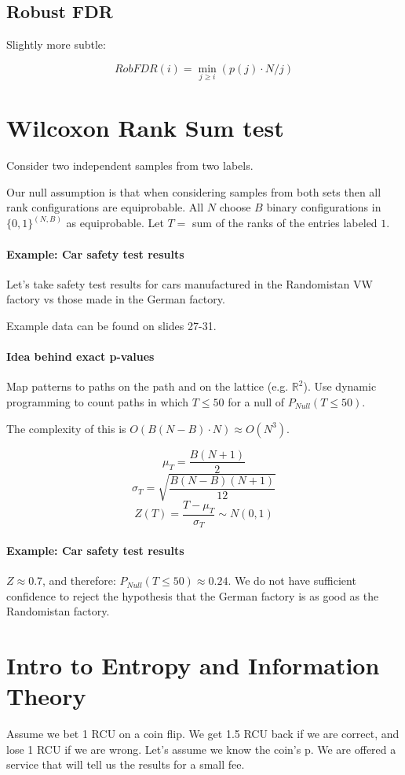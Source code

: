 \documentclass[a4paper]{article}
\begin{document}
\subsection{Robust FDR}
Slightly more subtle:

\[RobFDR(i)=\min_{j \ge i} (p(j)\cdot N / j)\]


\clearpage
\section{Wilcoxon Rank Sum test}
Consider two independent samples from two labels.

Our null assumption is that when considering samples from both sets then all rank configurations are equiprobable.
All $N$ choose $B$ binary configurations in $\{0,1\}^{(N,B)}$ as equiprobable.
Let $T =$ sum of the ranks of the entries labeled $1$.

\paragraph{Example: Car safety test results}
Let's take safety test results for cars manufactured in the Randomistan VW factory vs those made in the German factory.

Example data can be found on slides 27-31.

\paragraph{Idea behind exact p-values}
Map patterns to paths on the path and on the lattice (e.g. $\mathbb{R}^2$). Use dynamic programming to count paths in which $T \le 50$ for a null of $P_{Null}(T \le 50)$.

The complexity of this is $O(B(N-B)\cdot N) \approx O(N^3)$.

\[\mu_T=\frac{B(N+1)}{2}\]
\[\sigma_T=\sqrt{\frac{B(N-B)(N+1)}{12}}\]
\[Z(T)=\frac{T-\mu_T}{\sigma_T} \sim N(0,1)\]

\paragraph{Example: Car safety test results}
$Z \approx 0.7$, and therefore: $P_{Null}(T \le 50) \approx 0.24$. We do not have sufficient confidence to reject the hypothesis that the German factory is as good as the Randomistan factory.


\clearpage
\section{Intro to Entropy and Information Theory}
Assume we bet 1 RCU on a coin flip. We get 1.5 RCU back if we are correct, and lose 1 RCU if we are wrong.
Let's assume we know the coin's p.
We are offered a service that will tell us the results for a small fee.
\end{document}
